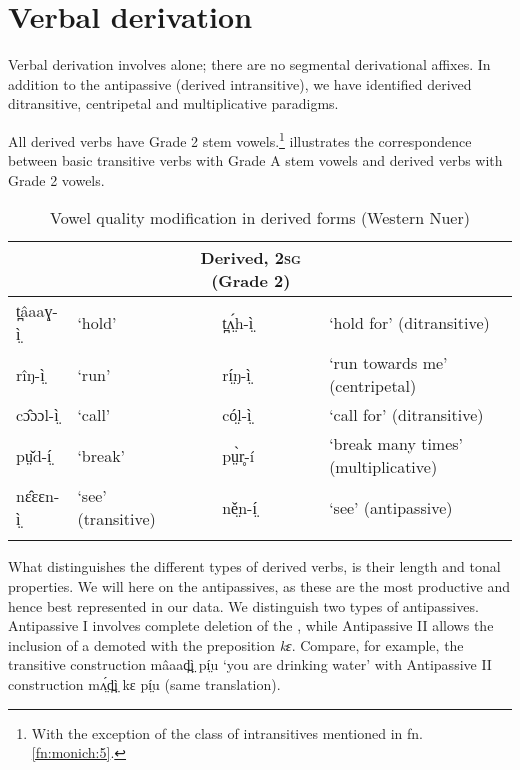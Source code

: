 \documentclass[output=paper,newtxmath,modfonts,nonflat]{langsci/langscibook}
\begin{document}
\section{Verbal derivation} %

Verbal derivation involves  alone; there are no segmental derivational affixes. In addition to the antipassive (derived intransitive), we have identified derived ditransitive, centripetal and multiplicative paradigms.

All derived verbs have Grade 2 stem vowels.\footnote{With the exception of the class of intransitives mentioned in fn. \ref{fn:monich:5}.}  illustrates the correspondence between basic transitive verbs with Grade A stem vowels and derived verbs with Grade 2 vowels.


\begin{table}
\begin{tabularx}{\textwidth}{llllX}
\lsptoprule
\multicolumn{2}{c}{\bfseries Basic, 2\textsc{sg} (Grade 1)} & & \multicolumn{2}{c}{\bfseries Derived, 2\textsc{sg} (Grade 2)}\\
\midrule
t̪âaaɣ-ì̤ & ‘hold’& & t̪ʌ̤́h-ì̤ & ‘hold for’ (ditransitive)\\
rîŋ-ì̤ & ‘run’ && rí̤ŋ-ì̤ & ‘run towards me’ (centripetal)\\
cɔ̂ɔɔl-ì̤ & ‘call’ && có̤l-ì̤ & ‘call for’ (ditransitive)\\
pṳ̌d-í̤ & ‘break’& & pṳ̀r̥-í & ‘break many times’ (multiplicative)\\
nɛ̂ɛɛn-ì̤ & ‘see’ (transitive) && ně̤n-í̤ & ‘see’ (antipassive)\\
\lspbottomrule
\end{tabularx}
\caption{Vowel quality modification in derived forms (Western Nuer)}
\label{tab:monich:12}
\end{table}

What distinguishes the different types of derived verbs, is their length and tonal properties. We will  here on the antipassives, as these are the most productive and hence best represented in our data. We distinguish two types of antipassives. Antipassive I involves complete deletion of the , while Antipassive II allows the inclusion of a demoted  with the preposition \textit{kɛ}. Compare, for example, the transitive construction mâaad̪ì̤ pí̤u ‘you are drinking water’ with Antipassive II construction mʌ̤́d̪ì̤ kɛ pí̤u (same translation).
\end{document}
